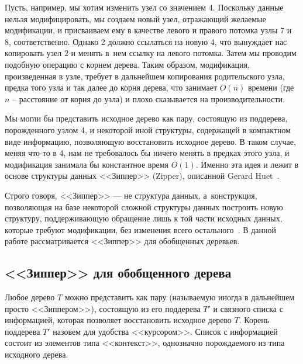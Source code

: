Пусть, например, мы хотим изменить узел со значением 4. Поскольку данные нельзя модифицировать, мы создаем новый узел, отражающий желаемые модификации, и присваиваем ему в качестве левого и правого потомка узлы 7 и 8, соответственно. Однако 2 должно ссылаться на новую 4, что вынуждает нас копировать узел 2 и менять в~нем ссылку на левого потомка. Затем мы проводим подобную операцию с корнем дерева. Таким образом, модификация, произведенная в узле, требует в дальнейшем копирования родительского узла, предка того узла и так далее до корня дерева, что занимает $O(n)$ времени (где $n$ -- расстояние от корня до узла) и плохо сказывается на производительности.

Мы могли бы представить исходное дерево как пару, состоящую из поддерева, порожденного узлом 4, и некоторой иной структуры, содержащей в компактном виде информацию, позволяющую восстановить исходное дерево. В таком случае, меняя что-то в 4, нам не требовалось бы ничего менять в предках этого узла, и модификация занимала бы константное время $O(1)$. Именно эта идея и лежит в основе структуры данных <<Зиппер>> (Zipper), описанной Gerard Huet~\autocite{Huet1997}.

Строго говоря, <<Зиппер>> --- не структура данных, а~конструкция, позволяющая на базе некоторой сложной структуры данных построить новую структуру, поддерживающую  обращение лишь к той части исходных данных, которые требуют модификации, без изменения всего остального~\autocite{Huet1997}. В данной работе рассматривается <<Зиппер>> для обобщенных деревьев.

\subsection{<<Зиппер>> для обобщенного дерева}

Любое дерево $T$ можно представить как пару (называемую иногда в дальнейшем просто <<Зиппером>>), состоящую из его поддерева $T'$ и связного списка с информацией, которая позволяет восстановить исходное дерево $T$. Корень поддерева $T'$ назовем для удобства <<курсором>>. Список с информацией состоит из элементов типа <<контекст>>, однозначно порождаемого из типа исходного дерева.



